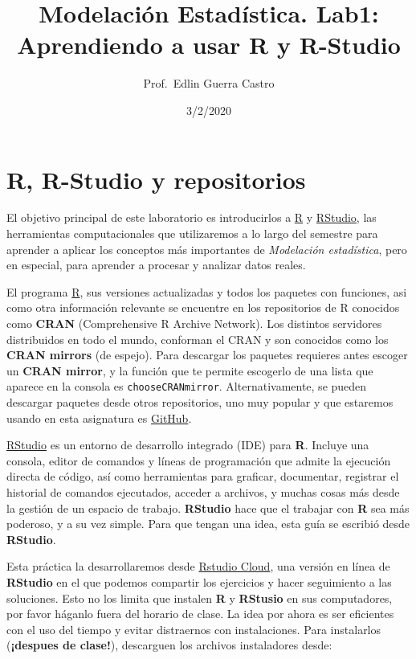 \documentclass[]{article}
\title{Modelación Estadística. Lab1: Aprendiendo a usar R y R-Studio}
\author{Prof.~Edlin Guerra Castro}
\date{3/2/2020}
\begin{document}
\maketitle

\hypertarget{r-r-studio-y-repositorios}{%
\section{R, R-Studio y repositorios}\label{r-r-studio-y-repositorios}}

El objetivo principal de este laboratorio es introducirlos a
\href{https://www.r-project.org/}{R} y
\href{https://rstudio.com/}{RStudio}, las herramientas computacionales
que utilizaremos a lo largo del semestre para aprender a aplicar los
conceptos más importantes de \emph{Modelación estadística}, pero en
especial, para aprender a procesar y analizar datos reales.

El programa \href{https://www.r-project.org/}{R}, sus versiones
actualizadas y todos los paquetes con funciones, asi como otra
información relevante se encuentre en los repositorios de R conocidos
como \textbf{CRAN} (Comprehensive R Archive Network). Los distintos
servidores distribuidos en todo el mundo, conforman el CRAN y son
conocidos como los \textbf{CRAN mirrors} (de espejo). Para descargar los
paquetes requieres antes escoger un \textbf{CRAN mirror}, y la función
que te permite escogerlo de una lista que aparece en la consola es
\texttt{chooseCRANmirror}. Alternativamente, se pueden descargar
paquetes desde otros repositorios, uno muy popular y que estaremos
usando en esta asignatura es \href{https://github.com/}{GitHub}.

\href{https://rstudio.com/}{RStudio} es un entorno de desarrollo
integrado (IDE) para \textbf{R}. Incluye una consola, editor de comandos
y líneas de programación que admite la ejecución directa de código, así
como herramientas para graficar, documentar, registrar el historial de
comandos ejecutados, acceder a archivos, y muchas cosas más desde la
gestión de un espacio de trabajo. \textbf{RStudio} hace que el trabajar
con \textbf{R} sea más poderoso, y a su vez simple. Para que tengan una
idea, esta guía se escribió desde \textbf{RStudio}.

Esta práctica la desarrollaremos desde
\href{https://rstudio.cloud/}{Rstudio Cloud}, una versión en línea de
\textbf{RStudio} en el que podemos compartir los ejercicios y hacer
seguimiento a las soluciones. Esto no los limita que instalen \textbf{R}
y \textbf{RStusio} en sus computadores, por favor háganlo fuera del
horario de clase. La idea por ahora es ser eficientes con el uso del
tiempo y evitar distraernos con instalaciones. Para instalarlos
(\textbf{¡despues de clase!}), descarguen los archivos instaladores
desde:
\end{document}
